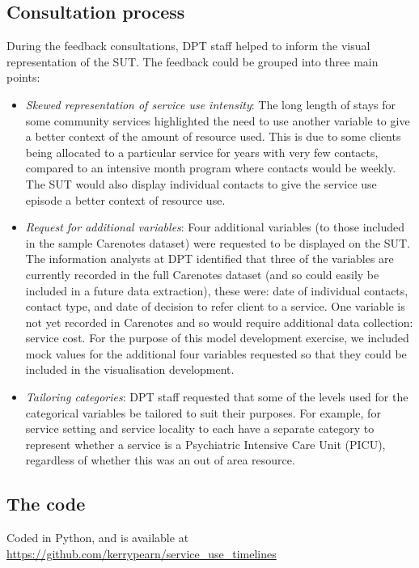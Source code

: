 \documentclass{article}
\begin{document}
\subsection{Consultation process}
During the feedback consultations, DPT staff helped to inform the visual representation of the SUT. The feedback could be grouped into three main points:
\begin{itemize}
	\item \emph{Skewed representation of service use intensity}: The long length of stays for some community services highlighted the need to use another variable to give a better context of the amount of resource used. This is due to some clients being allocated to a particular service for years with very few contacts, compared to an intensive month program where contacts would be weekly. The SUT would also display individual contacts to give the service use episode a better context of resource use.
	\item \emph{Request for additional variables}: Four additional variables (to those included in the sample Carenotes dataset) were requested to be displayed on the SUT.  The information analysts at DPT identified that three of the variables are currently recorded in the full Carenotes dataset (and so could easily be included in a future data extraction), these were: date of individual contacts, contact type, and date of decision to refer client to a service. One variable is not yet recorded in Carenotes and so would require additional data collection: service cost. For the purpose of this model development exercise, we included mock values for the additional four variables requested so that they could be included in the visualisation development. 
	\item \emph{Tailoring categories}: DPT staff requested that some of the levels used for the categorical variables be tailored to suit their purposes. For example, for service setting and service locality to each have a separate category to represent whether a service is a Psychiatric Intensive Care Unit (PICU), regardless of whether this was an out of area resource.
\end{itemize}

\subsection{The code}
Coded in Python, and is available at \url{https://github.com/kerrypearn/service_use_timelines}
\end{document}
